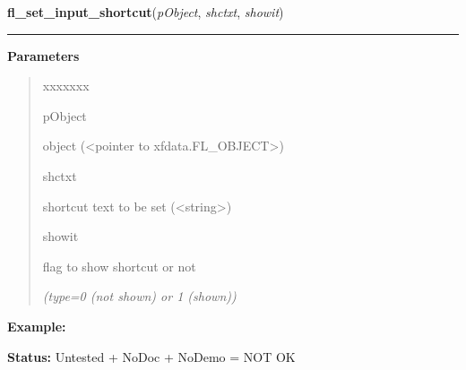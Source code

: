 \hspace{.8\funcindent}\begin{boxedminipage}{\funcwidth}

    \raggedright \textbf{fl\_set\_input\_shortcut}(\textit{pObject}, \textit{shctxt}, \textit{showit})

    \vspace{-1.5ex}

    \rule{\textwidth}{0.5\fboxrule}
\setlength{\parskip}{2ex}
\setlength{\parskip}{1ex}
      \textbf{Parameters}
      \vspace{-1ex}

      \begin{quote}
        \begin{Ventry}{xxxxxxx}

          \item[pObject]

          object ({\textless}pointer to xfdata.FL\_OBJECT{\textgreater})

          \item[shctxt]

          shortcut text to be set ({\textless}string{\textgreater})

          \item[showit]

          flag to show shortcut or not

            {\it (type=0 (not shown) or 1 (shown))}

        \end{Ventry}

      \end{quote}

\textbf{Example:} 

\textbf{Status:} Untested + NoDoc + NoDemo = NOT OK



    \end{boxedminipage}

    \label{xformslib:library:fl_set_input_editkeymap}

    \vspace{0.5ex}

